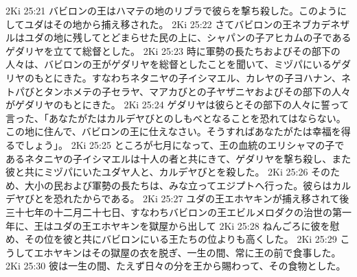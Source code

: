 2Ki 25:21  バビロンの王はハマテの地のリブラで彼らを撃ち殺した。このようにしてユダはその地から捕え移された。
2Ki 25:22  さてバビロンの王ネブカデネザルはユダの地に残してとどまらせた民の上に、シャパンの子アヒカムの子であるゲダリヤを立てて総督とした。
2Ki 25:23  時に軍勢の長たちおよびその部下の人々は、バビロンの王がゲダリヤを総督としたことを聞いて、ミヅパにいるゲダリヤのもとにきた。すなわちネタニヤの子イシマエル、カレヤの子ヨハナン、ネトパびとタンホメテの子セラヤ、マアカびとの子ヤザニヤおよびその部下の人々がゲダリヤのもとにきた。
2Ki 25:24  ゲダリヤは彼らとその部下の人々に誓って言った、「あなたがたはカルデヤびとのしもべとなることを恐れてはならない。この地に住んで、バビロンの王に仕えなさい。そうすればあなたがたは幸福を得るでしょう」。
2Ki 25:25  ところが七月になって、王の血統のエリシャマの子であるネタニヤの子イシマエルは十人の者と共にきて、ゲダリヤを撃ち殺し、また彼と共にミヅパにいたユダヤ人と、カルデヤびとを殺した。
2Ki 25:26  そのため、大小の民および軍勢の長たちは、みな立ってエジプトへ行った。彼らはカルデヤびとを恐れたからである。
2Ki 25:27  ユダの王エホヤキンが捕え移されて後三十七年の十二月二十七日、すなわちバビロンの王エビルメロダクの治世の第一年に、王はユダの王エホヤキンを獄屋から出して
2Ki 25:28  ねんごろに彼を慰め、その位を彼と共にバビロンにいる王たちの位よりも高くした。
2Ki 25:29  こうしてエホヤキンはその獄屋の衣を脱ぎ、一生の間、常に王の前で食事した。
2Ki 25:30  彼は一生の間、たえず日々の分を王から賜わって、その食物とした。


